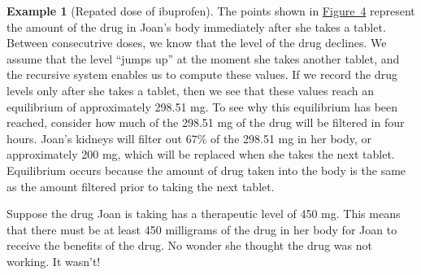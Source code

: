 \documentclass[10pt,]{book}
\theoremstyle{plain}
\theoremstyle{definition}
\theoremstyle{definition}
\newtheorem{example}[theorem]{Example}
\theoremstyle{definition}
\numberwithin{equation}{section}
\begin{document}
\begin{example}[Repated dose of ibuprofen]
The points shown in \hyperref[figure-ibuprofen-multi-dose]{Figure~4} represent the amount of the drug in Joan’s body immediately after she takes a tablet.  Between consecutrive doses, we know that the level of the drug declines.  We assume that the level “jumps up” at the moment she takes another tablet, and the recursive system enables us to compute these values.   If we  record the drug levels only after she takes a tablet, then we see that these values reach an equilibrium of approximately 298.51 mg.  To see why this equilibrium has been reached, consider how much of the 298.51 mg of the drug will be filtered in four hours.  Joan’s kidneys will filter out \(67\%\) of the 298.51 mg in her body, or approximately 200 mg, which will be replaced when she takes the next tablet. Equilibrium occurs because the amount of drug taken into the body is the same as the amount filtered prior to taking the next tablet.%
\par
\hypertarget{p-20}{}%
Suppose the drug Joan is taking has a therapeutic level of 450 mg.  This means that there must be at least 450 milligrams of the drug in her body for Joan to receive the benefits of the drug.  No wonder she thought the drug was not working.  It wasn’t!%
\end{example}
\typeout{************************************************}
\typeout{************************************************}
\end{document}

